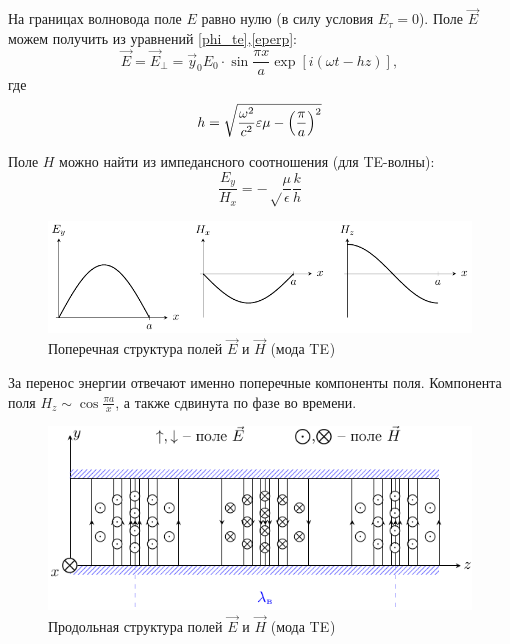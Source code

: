 На границах волновода поле $E$ равно нулю (в силу условия $E_\tau=0$). Поле $\vec{E}$ можем получить из уравнений \eqref{phi_te},\eqref{eperp}:
\begin{equation}
	\vec{E}=\vec{E}_\perp=\vec{y}_0E_0\cdot\sin\frac{\pi x}{a}\exp[i(\omega t - hz)],
\end{equation}
где 
\begin{equation}
	h=\sqrt{
		\frac{\omega^2}{c^2}\varepsilon \mu - \qty(\frac{\pi}{a})^2
	}
\end{equation}

Поле $H$ можно найти из импедансного соотношения (для TE-волны):
\begin{equation}
	\frac{E_y}{H_x}=-\sqrt\frac{\mu}{\epsilon}\frac{k}{h}
\end{equation}

\begin{figure}[h!]
	\centering
	\includegraphics[width=\textwidth]{img/lect4_ris9}
	\caption{Поперечная структура полей $\vec{E}$ и $\vec{H}$ (мода TE$_{}$)}
	\label{fig:lect4:9}
\end{figure}

За перенос энергии отвечают именно поперечные компоненты поля. Компонента поля
$H_z \sim \cos\frac{\pi a}{x}$, а также сдвинута по фазе во времени. 

\begin{figure}[H]
	\centering
	\includegraphics[width=\textwidth]{img/lect4_ris10}
	\caption{Продольная структура полей $\vec{E}$ и $\vec{H}$ (мода TE$_{}$)}
	\label{fig:lect4:10}
\end{figure}

